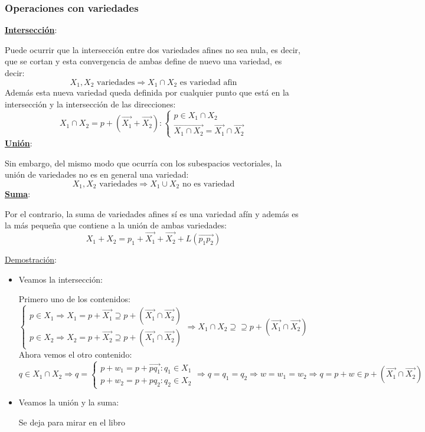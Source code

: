 \documentclass[10pt,a4paper,openright]{book}
\begin{document}
\subsubsection*{Operaciones con variedades}
\underline{\textbf{Intersección}}:

Puede ocurrir que la intersección entre dos variedades afines no sea nula, es decir, que se cortan y esta convergencia de ambas define de nuevo una variedad, es decir:
$$X_1, X_2\mbox{ variedades}\Rightarrow X_1\cap X_2\mbox{ es variedad afin}$$
Además esta nueva variedad queda definida por cualquier punto que está en la intersección y la intersección de las direcciones:
$$X_1\cap X_2 = p + (\vec{X_1}+\vec{X_2}): \begin{cases} p\in X_1\cap X_2 \\ \vec{X_1\cap X_2} = \vec{X_1} \cap  \vec{X_2}\end{cases}$$
\underline{\textbf{Unión}}:

Sin embargo, del mismo modo que ocurría con los subespacios vectoriales, la unión de variedades no es en general una variedad:
$$X_1,X_2\mbox{ variedades} \Rightarrow X_1 \cup X_2 \mbox{ no es variedad}$$
\underline{\textbf{Suma}}:

Por el contrario, la suma de variedades afines sí es una variedad afín y además es la más pequeña que contiene a la unión de ambas variedades:
$$X_1+X_2 = p_1 + \vec{X_1} + \vec{X_2} + L(\vec{p_1p_2})$$

\underline{Demostración}:
\begin{itemize}
\item Veamos la intersección:

Primero uno de los contenidos:
$$\begin{cases} p\in X_1\Rightarrow X_1 = p+\vec{X_1} \supseteq p+(\vec{X_1} \cap  \vec{X_2})\\ p\in X_2\Rightarrow X_2 = p+\vec{X_2} \supseteq p+(\vec{X_1} \cap  \vec{X_2})\end{cases} \Rightarrow X_1 \cap X_2 \supseteq \supseteq p+(\vec{X_1} \cap  \vec{X_2})$$
Ahora vemos el otro contenido:
$$q\in X_1\cap X_2\Rightarrow q = \begin{cases} p+w_1= p+\vec{pq_1} : q_1\in X_1 \\ p+w_2 = p+ pq_2 : q_2\in X_2\end{cases} \Rightarrow q = q_1 = q_2 \Rightarrow w = w_1 = w_2\Rightarrow q = p + w \in p+(\vec{X_1} \cap  \vec{X_2})$$

\item Veamos la unión y la suma:

Se deja para mirar en el libro
\end{itemize}
\end{document}

